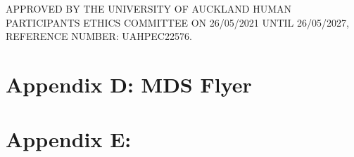 \documentclass[
]{interact}
\begin{document}
\noindent APPROVED BY THE UNIVERSITY OF AUCKLAND HUMAN PARTICIPANTS
ETHICS COMMITTEE ON 26/05/2021 UNTIL 26/05/2027, REFERENCE NUMBER:
UAHPEC22576.

\newpage{}

\section{Appendix D: MDS Flyer}\label{appendix-d-mds-flyer}

\begin{figure}


\caption{\label{fig-appendfig}}

\end{figure}%

\newpage{}

\section{Appendix E:}\label{appendix-e}
\end{document}
